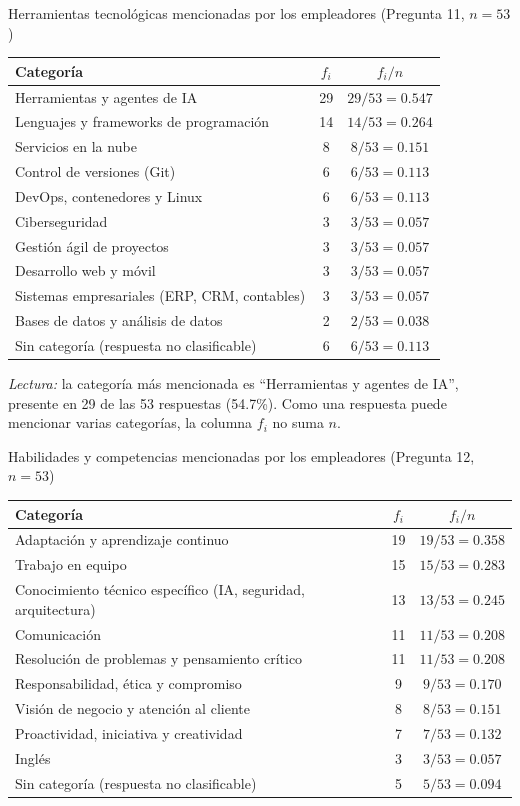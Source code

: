\begin{mitabla}{Herramientas tecnológicas mencionadas por los empleadores (Pregunta 11, $n=53$)}
\begin{tabular}{L{9cm}cc}
\toprule
Categoría & $f_i$ & $f_i/n$ \\
\midrule
Herramientas y agentes de IA & 29 & $29/53 = 0.547$ \\
Lenguajes y frameworks de programación & 14 & $14/53 = 0.264$ \\
Servicios en la nube & 8 & $8/53 = 0.151$ \\
Control de versiones (Git) & 6 & $6/53 = 0.113$ \\
DevOps, contenedores y Linux & 6 & $6/53 = 0.113$ \\
Ciberseguridad & 3 & $3/53 = 0.057$ \\
Gestión ágil de proyectos & 3 & $3/53 = 0.057$ \\
Desarrollo web y móvil & 3 & $3/53 = 0.057$ \\
Sistemas empresariales (ERP, CRM, contables) & 3 & $3/53 = 0.057$ \\
Bases de datos y análisis de datos & 2 & $2/53 = 0.038$ \\
\midrule
Sin categoría (respuesta no clasificable) & 6 & $6/53 = 0.113$ \\
\bottomrule
\end{tabular}
\end{mitabla}

\textit{Lectura:} la categoría más mencionada es ``Herramientas y agentes de IA'', presente en 29 de las 53 respuestas (54.7\%). Como una respuesta puede mencionar varias categorías, la columna $f_i$ no suma $n$.

\begin{mitabla}{Habilidades y competencias mencionadas por los empleadores (Pregunta 12, $n=53$)}
\begin{tabular}{L{9cm}cc}
\toprule
Categoría & $f_i$ & $f_i/n$ \\
\midrule
Adaptación y aprendizaje continuo & 19 & $19/53 = 0.358$ \\
Trabajo en equipo & 15 & $15/53 = 0.283$ \\
Conocimiento técnico específico (IA, seguridad, arquitectura) & 13 & $13/53 = 0.245$ \\
Comunicación & 11 & $11/53 = 0.208$ \\
Resolución de problemas y pensamiento crítico & 11 & $11/53 = 0.208$ \\
Responsabilidad, ética y compromiso & 9 & $9/53 = 0.170$ \\
Visión de negocio y atención al cliente & 8 & $8/53 = 0.151$ \\
Proactividad, iniciativa y creatividad & 7 & $7/53 = 0.132$ \\
Inglés & 3 & $3/53 = 0.057$ \\
\midrule
Sin categoría (respuesta no clasificable) & 5 & $5/53 = 0.094$ \\
\bottomrule
\end{tabular}
\end{mitabla}


